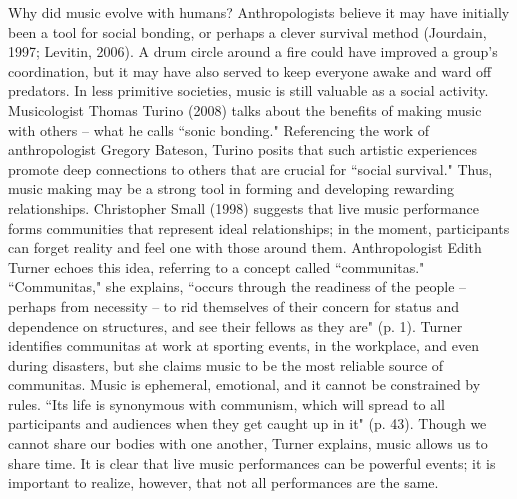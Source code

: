 Why did music evolve with humans? Anthropologists believe it may have initially been a tool for social bonding, or perhaps a clever survival method (Jourdain, 1997; Levitin, 2006). A drum circle around a fire could have improved a group's coordination, but it may have also served to keep everyone awake and ward off predators. In less primitive societies, music is still valuable as a social activity. Musicologist Thomas Turino (2008) talks about the benefits of making music with others -- what he calls ``sonic bonding." Referencing the work of anthropologist Gregory Bateson, Turino posits that such artistic experiences promote deep connections to others that are crucial for ``social survival." Thus, music making may be a strong tool in forming and developing rewarding relationships. Christopher Small (1998) suggests that live music performance forms communities that represent ideal relationships; in the moment, participants can forget reality and feel one with those around them. Anthropologist Edith Turner echoes this idea, referring to a concept called ``communitas." ``Communitas," she explains, ``occurs through the readiness of the people -- perhaps from necessity -- to rid themselves of their concern for status and dependence on structures, and see their fellows as they are" (p. 1). Turner identifies communitas at work at sporting events, in the workplace, and even during disasters, but she claims music to be the most reliable source of communitas. Music is ephemeral, emotional, and it cannot be constrained by rules. ``Its life is synonymous with communism, which will spread to all participants and audiences when they get caught up in it" (p. 43). Though we cannot share our bodies with one another, Turner explains, music allows us to share time. It is clear that live music performances can be powerful events; it is important to realize, however, that not all performances are the same.
